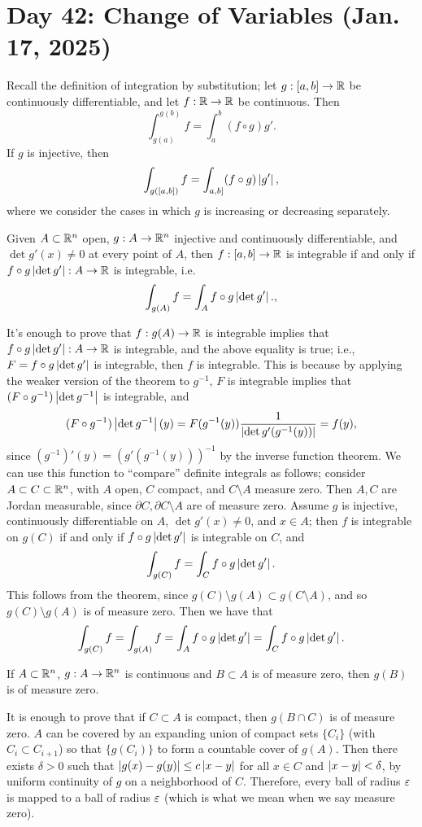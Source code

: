 \section{Day 42: Change of Variables (Jan. 17, 2025)}
Recall the definition of integration by substitution; let $g : [a, b] \to \mathbb R$ be continuously differentiable, and let $f : \mathbb R \to \mathbb R$ be continuous. Then
\[ \int_{g(a)}^{g(b)} f = \int_a^b (f \circ g) g'. \]
If $g$ is injective, then
\[ \int_{g([a, b])} f = \int_{a, b]} (f \circ g) \left\lvert g' \right\rvert, \]
where we consider the cases in which $g$ is increasing or decreasing separately.
\begin{simplethm}
    Given $A \subset \mathbb R^n$ open, $g : A \to \mathbb R^n$ injective and continuously differentiable, and $\det g'(x) \neq 0$ at every point of $A$, then $f : [a, b] \to \mathbb R$ is integrable if and only if $f \circ g \left\lvert \det g' \right\rvert : A \to \mathbb R$ is integrable, i.e.
    \[ \int_{g(A)} f = \int_A f \circ g \left\lvert \det g' \right\rvert., \] 
\end{simplethm}
\noindent It's enough to prove that $f : g(A) \to \mathbb R$ is integrable implies that $f \circ g \left\lvert \det g' \right\rvert : A \to \mathbb R$ is integrable, and the above equality is true; i.e., $F = f \circ g \left\lvert \det g' \right\rvert$ is integrable, then $f$ is integrable. This is because by applying the weaker version of the theorem to $g^{-1}$, $F$ is integrable implies that $(F \circ g^{-1}) \left\lvert \det g^{-1} \right\rvert$ is integrable, and
\[ (F \circ g^{-1}) \left\lvert \det g^{-1} \right\rvert (y) = F(g^{-1}(y)) \frac{1}{\left\lvert \det g'(g^{-1}(y)) \right\rvert} = f(y), \]
since $(g^{-1})'(y) = (g'(g^{-1}(y)))^{-1}$ by the inverse function theorem. We can use this function to ``compare'' definite integrals as follows; consider $A \subset C \subset \mathbb R^n$, with $A$ open, $C$ compact, and $C \setminus A$ measure zero. Then $A, C$ are Jordan measurable, since $\partial C, \partial C \setminus A$ are of measure zero. Assume $g$ is injective, continuously differentiable on $A$, $\det g'(x) \neq 0$, and $x \in A$; then $f$ is integrable on $g(C)$ if and only if $f \circ g \left\lvert \det g' \right\rvert$ is integrable on $C$, and
\[ \int_{g(C)} f = \int_C f \circ g \left\lvert \det g' \right\rvert. \]
This follows from the theorem, since $g(C) \setminus g(A) \subset g(C \setminus A)$, and so $g(C) \setminus g(A)$ is of measure zero. Then we have that
\[ \int_{g(C)} f = \int_{g(A)} f = \int_A f \circ g \left\lvert \det g' \right\rvert = \int_C f \circ g \left\lvert \det g' \right\rvert. \]
\begin{simplelemma}
    If $A \subset \mathbb R^n$, $g : A \to \mathbb R^n$ is continuous and $B \subset A$ is of measure zero, then $g(B)$ is of measure zero.
\end{simplelemma}
\noindent It is enough to prove that if $C \subset A$ is compact, then $g(B \cap C)$ is of measure zero. $A$ can be covered by an expanding union of compact sets $\{C_i\}$ (with $C_i \subset C_{i+1}$) so that $\{g(C_i)\}$ to form a countable cover of $g(A)$. Then there exists $\delta > 0$ such that $\left\lvert g(x) - g(y) \right\rvert \leq c \left\lvert x - y \right\rvert$ for all $x \in C$ and $\left\lvert x - y \right\rvert < \delta$, by uniform continuity of $g$ on a neighborhood of $C$. Therefore, every ball of radius $\varepsilon$ is mapped to a ball of radius $\varepsilon$ (which is what we mean when we say measure zero).